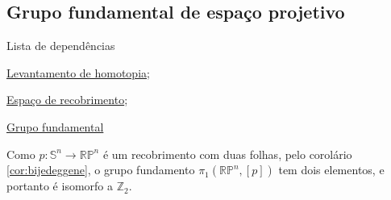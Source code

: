 \subsection{Grupo fundamental de espaço projetivo}
\label{grupo-fundamental-de-espaco-projetivo-ex}
\begin{titlemize}{Lista de dependências}
	\item \hyperref[levantamento-de-homotopia-prop]{Levantamento de homotopia};\\ %
	\item \hyperref[espaco-de-recobrimento-def]{Espaço de recobrimento};\\
    \item \hyperref[grupo-fundamental]{Grupo fundamental}
\end{titlemize}

\begin{ex}
	Como $p:\mathbb{S}^n\rightarrow \mathbb{RP}^n$ é um recobrimento com duas folhas, pelo corolário \ref{cor:bijedeggene}, o grupo fundamento $\pi_1(\mathbb{RP}^n,[p])$ tem dois elementos, e portanto é isomorfo a $\mathbb{Z}_2.$ 
\end{ex}
